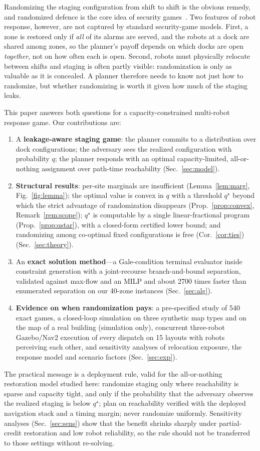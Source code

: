 \documentclass[letterpaper,journal]{IEEEtran}
\theoremstyle{remark}
\begin{document}
Randomizing the staging configuration from shift to shift is the obvious remedy, and randomized defence is the core idea of security games~\cite{tambe2011,korzhyk2011}. Two features of robot response, however, are not captured by standard security-game models. First, a zone is restored only if \emph{all} of its alarms are served, and the robots at a dock are shared among zones, so the planner's payoff depends on which docks are open \emph{together}, not on how often each is open. Second, robots must physically relocate between shifts and staging is often partly visible: randomization is only as valuable as it is concealed. A planner therefore needs to know not just how to randomize, but whether randomizing is worth it given how much of the staging leaks.

This paper answers both questions for a capacity-constrained multi-robot response game. Our contributions are:
\begin{enumerate}
\item A \textbf{leakage-aware staging game}: the planner commits to a distribution over dock configurations; the adversary sees the realized configuration with probability $q$; the planner responds with an optimal capacity-limited, all-or-nothing assignment over path-time reachability (Sec.~\ref{sec:model}).
\item \textbf{Structural results}: per-site marginals are insufficient (Lemma~\ref{lem:marg}, Fig.~\ref{fig:lemma}); the optimal value is convex in $q$ with a threshold $q^\star$ beyond which the strict advantage of randomization disappears (Prop.~\ref{prop:convex}, Remark~\ref{rem:scope}); $q^\star$ is computable by a single linear-fractional program (Prop.~\ref{prop:qstar}), with a closed-form certified lower bound; and randomizing among co-optimal fixed configurations is free (Cor.~\ref{cor:ties}) (Sec.~\ref{sec:theory}).
\item An \textbf{exact solution method}---a Gale-condition terminal evaluator inside constraint generation with a joint-recourse branch-and-bound separation, validated against max-flow and an MILP and about 2700 times faster than enumerated separation on our 40-zone instances (Sec.~\ref{sec:alg}).
\item \textbf{Evidence on when randomization pays}: a pre-specified study of 540 exact games, a closed-loop simulation on three synthetic map types and on the map of a real building (simulation only), concurrent three-robot Gazebo/Nav2 execution of every dispatch on 15 layouts with robots perceiving each other, and sensitivity analyses of relocation exposure, the response model and scenario factors (Sec.~\ref{sec:exp}).
\end{enumerate}
The practical message is a deployment rule, valid for the all-or-nothing restoration model studied here: randomize staging only where reachability is sparse and capacity tight, and only if the probability that the adversary observes the realized staging is below $q^\star$; plan on reachability verified with the deployed navigation stack and a timing margin; never randomize uniformly. Sensitivity analyses (Sec.~\ref{sec:sens}) show that the benefit shrinks sharply under partial-credit restoration and low robot reliability, so the rule should not be transferred to those settings without re-solving.
\end{document}
